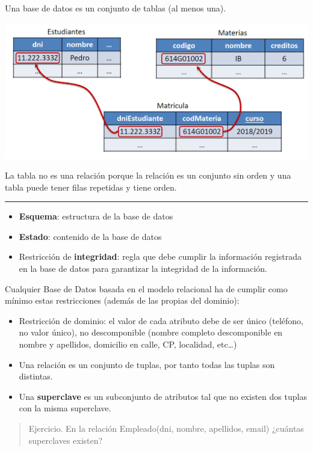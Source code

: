 \documentclass[]{book}
\begin{document}
Una base de datos es un conjunto de tablas (al menos una).

\includegraphics[width=6.25in,height=\textheight]{images/BBDD.png}

La tabla no es una relación porque la relación es un conjunto sin orden y una tabla puede tener filas repetidas y tiene orden.

\begin{center}\rule{0.5\linewidth}{\linethickness}\end{center}

\begin{itemize}
\item
  \textbf{Esquema}: estructura de la base de datos
\item
  \textbf{Estado}: contenido de la base de datos
\item
  Restricción de \textbf{integridad}: regla que debe cumplir la información registrada en la base de datos para garantizar la integridad de la información.
\end{itemize}

Cualquier Base de Datos basada en el modelo relacional ha de cumplir como mínimo estas restricciones (además de las propias del dominio):

\begin{itemize}
\item
  Restricción de dominio: el valor de cada atributo debe de ser único (teléfono, no valor único), no descomponible (nombre completo descomponible en nombre y apellidos, domicilio en calle, CP, localidad, etc\ldots{})
\item
  Una relación es un conjunto de tuplas, por tanto todas las tuplas son distintas.
\item
  Una \textbf{superclave} es un subconjunto de atributos tal que no existen dos tuplas con la misma superclave.
\end{itemize}

\begin{quote}
Ejercicio. En la relación Empleado(dni, nombre, apellidos, email) ¿cuántas superclaves existen?
\end{quote}
\end{document}
